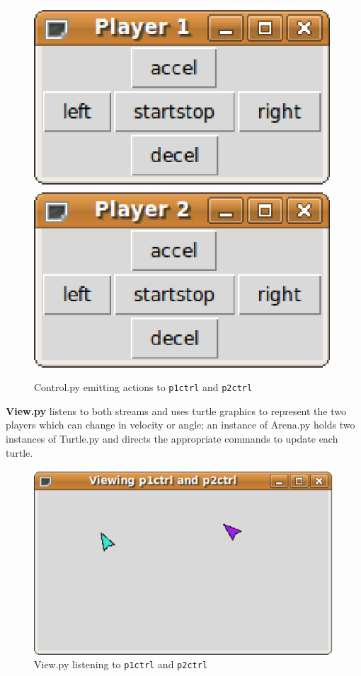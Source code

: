 \documentclass[12pt,a4,notitlepage]{report}
\renewcommand{\_}{\texttt{\symbol{95}}}
\newcommand{\<}{\texttt{\symbol{60}}}
\renewcommand{\>}{\texttt{\symbol{62}}}
\newcommand{\class}[1]{\textbf{#1}}
\newcommand{\scopendpoint}[1]{\texttt{#1}}
\begin{document}
\begin{figure}[hb]
\centering
\includegraphics[scale=0.5,angle=0]{images/ControlP1.ps}
\includegraphics[scale=0.5,angle=0]{images/ControlP2.ps}
\caption{Control.py emitting actions to \scopendpoint{p1ctrl} and \scopendpoint{p2ctrl}}
\label{control}
\end{figure}

\class{View.py} listens to both streams and uses turtle graphics to represent the two players which can change in velocity or angle; an instance of Arena.py holds two instances of Turtle.py and directs the appropriate commands to update each turtle.

\begin{figure}[hb]
\centering
\includegraphics[scale=0.5,angle=0]{images/View.ps}
\caption{View.py listening to \scopendpoint{p1ctrl} and \scopendpoint{p2ctrl}}
\label{control}
\end{figure}
\end{document}
